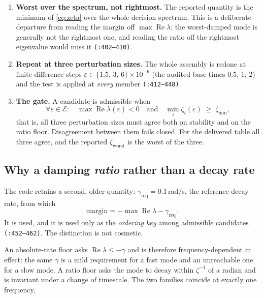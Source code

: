 \documentclass[12pt,a4paper]{article}
\theoremstyle{remark}
\newcommand{\zmin}{\zeta_{\min}}
\newcommand{\zworst}{\zeta_{\mathrm{worst}}}
\newcommand{\greq}{\gamma_{\mathrm{req}}}
\newcommand{\code}[1]{\texttt{\small #1}}
\begin{document}
\begin{enumerate}[leftmargin=1.7em,itemsep=3pt]
      \code{(:492--516)}.
\item \textbf{Worst over the spectrum, not rightmost.} The reported quantity is
      the minimum of \eqref{eq:zeta} over the whole decision spectrum. This is a
      deliberate departure from reading the margin off
      $\max\operatorname{Re}\lambda$: the worst-damped mode is generally not the
      rightmost one, and reading the ratio off the rightmost eigenvalue would
      miss it \code{(:402--410)}.
\item \textbf{Repeat at three perturbation sizes.} The whole assembly is redone
      at finite-difference steps $\varepsilon \in \{1.5,\,3,\,6\}\times10^{-6}$
      (the audited base times $0.5$, $1$, $2$) and the test is applied at
      \emph{every} member \code{(:412--448)}.
\item \textbf{The gate.} A candidate is admissible when
      \begin{equation}
      \forall \varepsilon \in \mathcal{E}:\quad
      \max\operatorname{Re}\lambda(\varepsilon) < 0
      \quad\text{and}\quad
      \min_i \zeta_i(\varepsilon) \;\ge\; \zmin,
      \label{eq:gate}
      \end{equation}
      that is, all three perturbation sizes must agree both on stability and on
      the ratio floor. Disagreement between them fails closed. For the delivered
      table all three agree, and the reported $\zworst$ is the worst of the
      three.
\end{enumerate}

\subsection{Why a damping \emph{ratio} rather than a decay rate}

The code retains a second, older quantity: $\greq = 0.1$\,rad/s, the reference
decay rate, from which
\begin{equation}
\mathrm{margin} = -\max\operatorname{Re}\lambda - \greq .
\label{eq:margin}
\end{equation}
It is used, and it is used only as the \emph{ordering key} among admissible
candidates \code{(:452--462)}. The distinction is not cosmetic.

An absolute-rate floor asks $\operatorname{Re}\lambda \le -\gamma$ and is
therefore frequency-dependent in effect: the same $\gamma$ is a mild requirement
for a fast mode and an unreachable one for a slow mode. A ratio floor asks the
mode to decay within $\zeta^{-1}$ of a radian and is invariant under a change of
timescale. The two families coincide at exactly one frequency,
\end{document}

